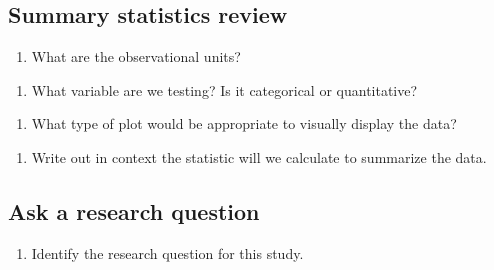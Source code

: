 \documentclass[
]{report}
\providecommand{\tightlist}{%
  \setlength{\itemsep}{0pt}\setlength{\parskip}{0pt}}
\begin{document}
\hypertarget{summary-statistics-review}{%
\subsection{Summary statistics review}\label{summary-statistics-review}}

\begin{enumerate}
\def\labelenumi{\arabic{enumi}.}
\tightlist
\item
  What are the observational units?
\end{enumerate}

\vspace{0.5in}

\begin{enumerate}
\def\labelenumi{\arabic{enumi}.}
\setcounter{enumi}{1}
\tightlist
\item
  What variable are we testing? Is it categorical or quantitative?
\end{enumerate}

\vspace{0.5in}

\begin{enumerate}
\def\labelenumi{\arabic{enumi}.}
\setcounter{enumi}{2}
\tightlist
\item
  What type of plot would be appropriate to visually display the data?
\end{enumerate}

\vspace{0.5in}

\begin{enumerate}
\def\labelenumi{\arabic{enumi}.}
\setcounter{enumi}{3}
\tightlist
\item
  Write out in context the statistic will we calculate to summarize the data.
\end{enumerate}

\vspace{0.5in}

\hypertarget{ask-a-research-question}{%
\subsection{Ask a research question}\label{ask-a-research-question}}

\begin{enumerate}
\def\labelenumi{\arabic{enumi}.}
\setcounter{enumi}{4}
\tightlist
\item
  Identify the research question for this study.
\end{enumerate}
\end{document}
